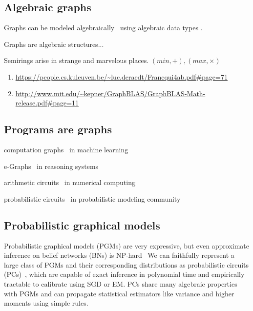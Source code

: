 \documentclass[11pt]{article}
\begin{document}
    \subsection{Algebraic graphs}\label{subsec:algebraic-graphs}

    Graphs can be modeled algebraically~\citep{weisfeiler1968reduction}  using algebraic data types \citep{mokhov2017algebraic}.

    Graphs are algebraic structures...

    Semirings arise in strange and marvelous places. $(min, +), (max, \times)$

    \begin{enumerate}
        \item \url{https://people.cs.kuleuven.be/~luc.deraedt/Francqui4ab.pdf#page=71}
        \item \url{http://www.mit.edu/~kepner/GraphBLAS/GraphBLAS-Math-release.pdf#page=11}
    \end{enumerate}

    \subsection{Programs are graphs}\label{sec:program-graphs}

    computation graphs~\citep{breuleux2017automatic} in machine learning

    e-Graphs~\citep{willsey2020egg} in reasoning systems

    arithmetic circuits~\citep{miller1988efficient} in numerical computing

    probabilistic circuits~\citep{choi2020probabilistic} in probabilistic modeling community

    \subsection{Probabilistic graphical models}\label{sec:pgms}

    Probabilistic graphical models (PGMs) are very expressive, but even approximate inference on belief networks (BNs) is NP-hard~\citep{dagum1993approximating} We can faithfully represent a large class of PGMs and their corresponding distributions as probabilistic circuits (PCs)~\citep{choi2020probabilistic}, which are capable of exact inference in polynomial time and empirically tractable to calibrate using SGD or EM. PCs share many algebraic properties with PGMs and can propagate statistical estimators like variance and higher moments using simple rules.
\end{document}
